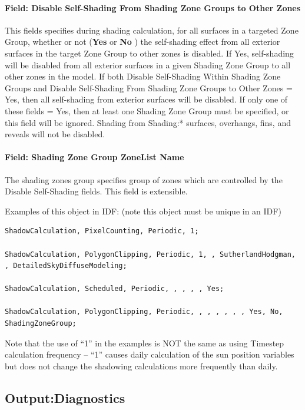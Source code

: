 \paragraph{Field: Disable Self-Shading From Shading Zone Groups to Other Zones}\label{field-self-disable-shading-between-zone-groups}
This fields specifies during shading calculation, for all surfaces in a targeted Zone Group, whether or not (\textbf{Yes} or \textbf{No} ) the self-shading effect from all exterior surfaces in the target Zone Group to other zones is disabled. If Yes, self-shading will be disabled from all exterior surfaces in a given Shading Zone Group to all other zones in the model. If both Disable Self-Shading Within Shading Zone Groups and Disable Self-Shading From Shading Zone Groups to Other Zones = Yes, then all self-shading from exterior surfaces will be disabled. If only one of these fields = Yes, then at least one Shading Zone Group must be specified, or this field will be ignored. Shading from Shading:* surfaces, overhangs, fins, and reveals will not be disabled.

\paragraph{Field: Shading Zone Group ZoneList Name}\label{field-shading-zone-group-zoneList-name}
The shading zones group specifies group of zones which are controlled by the Disable Self-Shading fields.
This field is extensible.

Examples of this object in IDF: (note this object must be unique in an IDF)

\begin{lstlisting}
ShadowCalculation, PixelCounting, Periodic, 1;

ShadowCalculation, PolygonClipping, Periodic, 1, , SutherlandHodgman, , DetailedSkyDiffuseModeling;

ShadowCalculation, Scheduled, Periodic, , , , , Yes;

ShadowCalculation, PolygonClipping, Periodic, , , , , , , Yes, No, ShadingZoneGroup;
\end{lstlisting}

Note that the use of ``1'' in the examples is NOT the same as using Timestep calculation frequency -- ``1'' causes daily calculation of the sun position variables but does not change the shadowing calculations more frequently than daily.

\subsection{Output:Diagnostics}\label{outputdiagnostics}

